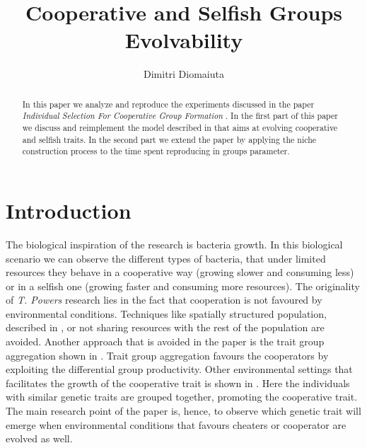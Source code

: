 \documentclass[runningheads]{llncs}
\begin{document}
%
\title{Cooperative and Selfish Groups Evolvability}
%
%
\author{Dimitri Diomaiuta}
%
%
%
\maketitle              %
%
\begin{abstract}
In this paper we analyze and reproduce the experiments discussed in
the paper \textit{Individual
Selection For Cooperative Group Formation} \cite{groups}. In the first
part of this paper we discuss and reimplement the model described in
\cite{groups} that aims at evolving cooperative and selfish traits. In
the second part we extend the paper by applying the niche construction
process to the time spent reproducing in groups parameter.
\end{abstract}
%
%
%

\section{Introduction}
The biological inspiration of the research is bacteria growth. In this
biological scenario we can observe the different types of bacteria,
that under limited resources they behave in a cooperative way (growing
slower and consuming less) or in a selfish one (growing faster and
consuming more resources).
The originality of \textit{T. Powers} research \cite{groups} lies in
the fact that cooperation is not favoured by environmental
conditions. Techniques like spatially structured population, described
in \cite{b1,b2,b3,b5}, or not sharing resources with the rest of the
population are avoided. Another approach that is avoided in the
paper is the trait group aggregation shown in \cite{b6,b7,b8}. Trait
group aggregation favours the cooperators by exploiting the
differential group productivity. Other environmental settings that
facilitates the growth of the cooperative trait is shown in
\cite{b7,b8,b9}. Here the individuals with similar genetic traits are
grouped together, promoting the cooperative trait. The main research
point of the paper is, hence, to observe which genetic trait will
emerge when environmental conditions that favours cheaters or
cooperator are evolved as well.
\end{document}
